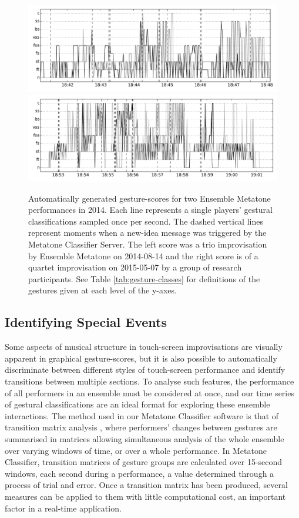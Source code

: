 \documentclass[graybox]{svmult}
\begin{document}
\begin{figure}
\centering
\includegraphics[width=0.85\textheight,angle=90,origin=c]{figures/Performance-14-08-14-18_40-bw.pdf}
\includegraphics[width=0.85\textheight,angle=90,origin=c]{figures/gesture-score-15-05-07-18-52-bw.pdf}
\caption{Automatically generated gesture-scores for two Ensemble
  Metatone performances in 2014. Each line represents a
  single players' gestural classifications sampled once per second.
  The dashed vertical lines represent moments when a new-idea
  message was triggered by the Metatone Classifier Server. The left
  score was a trio improvisation by Ensemble Metatone on 2014-08-14
  and the right score is of a quartet improvisation on 2015-05-07 by a
  group of research participants. See Table \ref{tab:gesture-classes}
  for definitions of the gestures given at each level of the y-axes.}
\label{gesturescore}
\end{figure}

\subsection{Identifying Special Events}
\label{subsec:special-events}

Some aspects of musical structure in touch-screen improvisations are
visually apparent in graphical gesture-scores, but it is also possible
to automatically discriminate between different styles of touch-screen
performance and identify transitions between multiple sections. To
analyse such features, the performance of all performers in an
ensemble must be considered at once, and our time series of gestural
classifications are an ideal format for exploring these ensemble
interactions. The method used in our Metatone Classifier software is
that of transition matrix analysis \citep{Swift:2014tya}, where
performers' changes between gestures are summarised in matrices
allowing simultaneous analysis of the whole ensemble over varying
windows of time, or over a whole performance. In Metatone Classifier,
transition matrices of gesture groups are calculated over 15-second
windows, each second during a performance, a value determined through
a process of trial and error. Once a transition matrix has been
produced, several measures can be applied to them with little
computational cost, an important factor in a real-time application.
\end{document}
